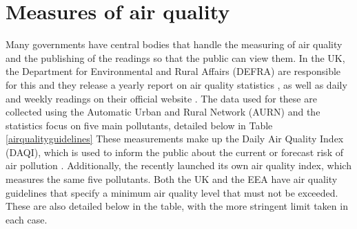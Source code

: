 \documentclass[11pt]{report}
\begin{document}
\section{Measures of air quality} \label{airqualitymeasures}

Many governments have central bodies that handle the measuring of air quality and the publishing of the readings so that the public can view them. In the UK, the Department for Environmental and Rural Affairs (DEFRA) are responsible for this and they release a yearly report on air quality statistics \citep{govuk2017airquality}, as well as daily and weekly readings on their official website \citep{defra2018website}. The data used for these are collected using the Automatic Urban and Rural Network (AURN) and the statistics focus on five main pollutants, detailed below in Table \ref{airqualityguidelines} These measurements make up the Daily Air Quality Index (DAQI), which is used to inform the public about the current or forecast risk of air pollution \citep{defra2018daqi}. Additionally, the \cite{eea2018airqualityindex} recently launched its own air quality index, which measures the same five pollutants. Both the UK and the EEA have air quality guidelines that specify a minimum air quality level that must not be exceeded. These are also detailed below in the table, with the more stringent limit taken in each case.

\end{document}
